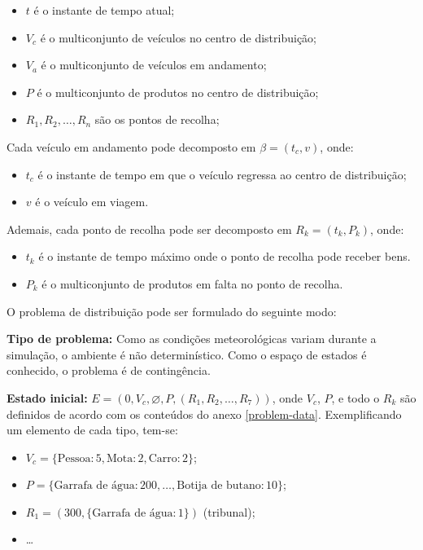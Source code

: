 \documentclass[12pt, a4paper, titlepage]{article}
\begin{document}
\begin{itemize}
    \item $t$ é o instante de tempo atual;
    \item $V_c$ é o multiconjunto de veículos no centro de distribuição;
    \item $V_a$ é o multiconjunto de veículos em andamento;
    \item $P$ é o multiconjunto de produtos no centro de distribuição;
    \item $R_1, R_2, \ldots, R_n$ são os pontos de recolha;
\end{itemize}

Cada veículo em andamento pode decomposto em $\beta = (t_c, v)$, onde:

\begin{itemize}
    \item $t_c$ é o instante de tempo em que o veículo regressa ao centro de distribuição;
    \item $v$ é o veículo em viagem.
\end{itemize}

Ademais, cada ponto de recolha pode ser decomposto em $R_k = (t_k, P_k)$, onde:

\begin{itemize}
    \item $t_k$ é o instante de tempo máximo onde o ponto de recolha pode receber bens.
    \item $P_k$ é o multiconjunto de produtos em falta no ponto de recolha.
\end{itemize}

O problema de distribuição pode ser formulado do seguinte modo:

\textbf{Tipo de problema:} Como as condições meteorológicas variam durante a simulação, o ambiente é
não determinístico. Como o espaço de estados é conhecido, o problema é de contingência.

\textbf{Estado inicial:} $E = (0, V_c, \varnothing, P, (R_1, R_2, \ldots, R_7))$, onde $V_c$, $P$, e
todo o $R_k$ são definidos de acordo com os conteúdos do anexo \ref{problem-data}. Exemplificando um
elemento de cada tipo, tem-se:

\begin{itemize}
    \item $V_c = \lbrace \text{Pessoa}: 5, \text{Mota}: 2, \text{Carro}: 2 \rbrace$;
    \item $P = \lbrace \text{Garrafa de água}: 200, \ldots, \text{Botija de butano}: 10 \rbrace$;
    \item $R_1 = (300, \lbrace \text{Garrafa de água}: 1 \rbrace)$ {\color{gray} (tribunal)};
    \item \ldots
\end{itemize}
\end{document}
